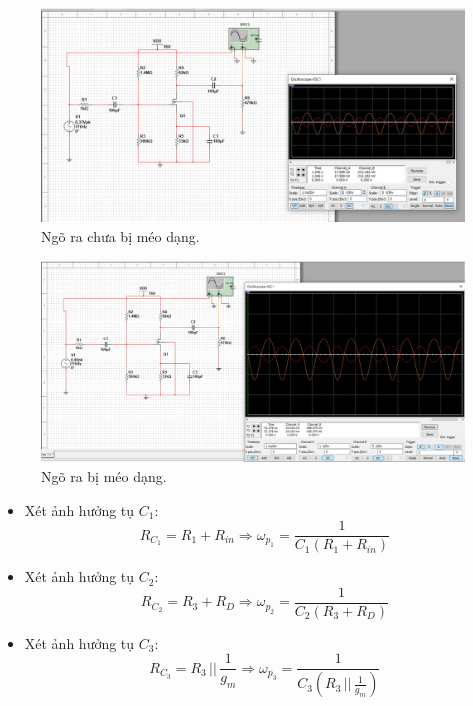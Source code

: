 \begin{figure}[H]
	\centering
	\includegraphics[width=\linewidth]{./my-chapters/my-images/Question1/c_1.jpg}
	\caption{Ngõ ra chưa bị méo dạng.}
\end{figure}
\begin{figure}[H]
	\centering
	\includegraphics[width=\linewidth]{./my-chapters/my-images/Question1/c_2.jpg}
	\caption{Ngõ ra bị méo dạng.}
\end{figure}


\begin{itemize}[label=-]
	\item Xét ảnh hưởng tụ $C_{1}$: 
	\[
	R_{C_{1}}=R_{1}+R_{in}
	\Longrightarrow \omega_{p_{1}}=\frac{1}{C_{1}(R_{1}+R_{in})}
	\]
	
	\item Xét ảnh hưởng tụ $C_{2}$: 
	\[
	R_{C_{2}}=R_{3}+R_{D}
	\Longrightarrow \omega_{p_{2}}=\frac{1}{C_{2}(R_{3}+R_{D})}
	\]
	
	\item Xét ảnh hưởng tụ $C_{3}$: 
	\[
	R_{C_{3}}=R_{3}\,||\,\frac{1}{g_{m}}
	\Longrightarrow \omega_{p_{3}}=\frac{1}{C_{3}\left(R_{3}\,||\,\frac{1}{g_{m}}\right)}
	\]
\end{itemize}

